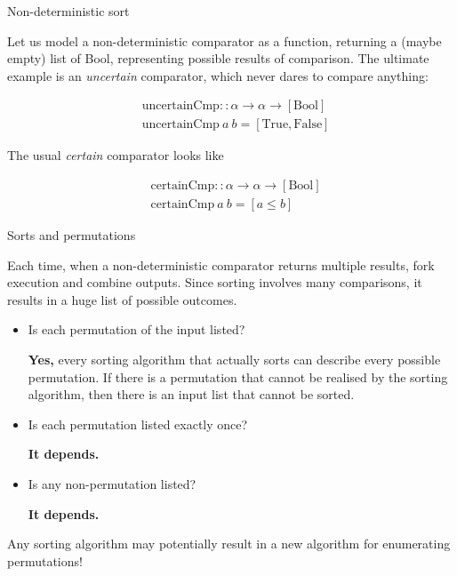 \documentclass[handout]{beamer}
\def\le{\leqslant}
\begin{document}
\begin{frame}{Non-deterministic sort}

Let us model a non-deterministic comparator as a function, returning a (maybe empty) list of Bool, representing possible results of comparison. The ultimate example is an {\em uncertain} comparator, which never dares to compare anything:

\begin{align*}
& \text{uncertainCmp} :: \alpha \to \alpha \to [\text{Bool}] \\
& \text{uncertainCmp} ~ a ~ b = [\text{True}, \text{False}]
\end{align*}

The usual {\em certain} comparator looks like

\begin{align*}
& \text{certainCmp} :: \alpha \to \alpha \to [\text{Bool}] \\
& \text{certainCmp} ~ a ~ b = [ a \le b ]
\end{align*}

\end{frame}

\begin{frame}{Sorts and permutations}

Each time, when a non-deterministic comparator returns multiple results, fork execution and combine outputs. Since sorting involves many comparisons, it results in a huge list of possible outcomes.

\begin{itemize}

\item Is each permutation of the input listed? \par
  {\bf Yes,} every sorting algorithm that actually sorts can describe every possible permutation. If there is a permutation that cannot be realised by the sorting algorithm, then there is an input list that cannot be sorted.

\item Is each permutation listed exactly once? \par {\bf It depends.}

\item Is any non-permutation listed? \par {\bf It depends.}
\end{itemize}

Any sorting algorithm may potentially result in a new algorithm for enumerating permutations!

\end{frame}
\end{document}
